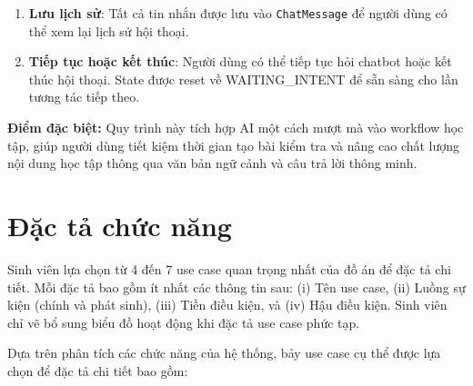 \documentclass[../DoAn.tex]{subfiles}
\begin{document}
\begin{enumerate}
\begin{itemize}
        \item \textbf{Ask Question}: Trả về câu trả lời dựa trên ngữ cảnh của bộ flashcard, giúp người học giải đáp thắc mắc.
    \end{itemize}
    \item \textbf{Lưu lịch sử}: Tất cả tin nhắn được lưu vào \texttt{ChatMessage} để người dùng có thể xem lại lịch sử hội thoại.
    \item \textbf{Tiếp tục hoặc kết thúc}: Người dùng có thể tiếp tục hỏi chatbot hoặc kết thúc hội thoại. State được reset về WAITING\_INTENT để sẵn sàng cho lần tương tác tiếp theo.
\end{enumerate}

\textbf{Điểm đặc biệt:} Quy trình này tích hợp AI một cách mượt mà vào workflow học tập, giúp người dùng tiết kiệm thời gian tạo bài kiểm tra và nâng cao chất lượng nội dung học tập thông qua văn bản ngữ cảnh và câu trả lời thông minh.
\section{Đặc tả chức năng}
\label{section:2.3}
Sinh viên lựa chọn từ 4 đến 7 use case quan trọng nhất của đồ án để đặc tả chi tiết. Mỗi đặc tả bao gồm ít nhất các thông tin sau: (i) Tên use case, (ii) Luồng sự kiện (chính và phát sinh), (iii) Tiền điều kiện, và (iv) Hậu điều kiện. Sinh viên chỉ vẽ bổ sung biểu đồ hoạt động khi đặc tả use case phức tạp.

Dựa trên phân tích các chức năng của hệ thống, bảy use case cụ thể được lựa chọn để đặc tả chi tiết bao gồm:
\end{document}
